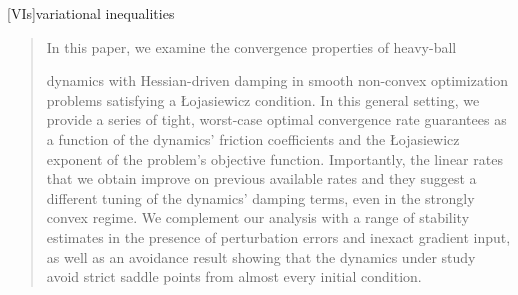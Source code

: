 \documentclass[reqno]{amsart}
\theoremstyle{plain}
\theoremstyle{definition}
\theoremstyle{remark}
\newcommand{\PM}[1]{}
\begin{document}
[VIs]{variational inequalities}



\maketitle
\begin{abstract}
%
%
In this paper, we examine the convergence properties of heavy-ball
\PM{``heavy-ball'' or ``heavy ball''?}
dynamics with Hessian-driven damping in smooth non-convex optimization problems satisfying a \L ojasiewicz condition.
In this general setting, we provide a series of tight, worst-case optimal convergence rate guarantees as a function of the dynamics' friction coefficients and the \L ojasiewicz exponent of the problem's objective function.
Importantly, the linear rates that we obtain improve on previous available rates and they suggest a different tuning of the dynamics' damping terms, even in the strongly convex regime.
We complement our analysis with a range of stability estimates in the presence of perturbation errors and inexact gradient input, as well as an avoidance result showing that the dynamics under study avoid strict saddle points from almost every initial condition.
\end{abstract}


\allowdisplaybreaks	%
\acresetall	%
\maketitle
\end{document}
